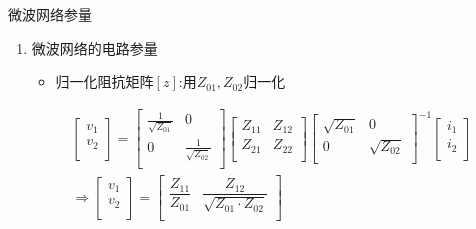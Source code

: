 \begin{frame}{微波网络参量}
    \begin{enumerate}
        \item 微波网络的电路参量
              \begin{itemize}
                  \item 归一化阻抗矩阵$[z]$:用$Z_{01},Z_{02}$归一化
              \end{itemize}
              \begin{gather}
                  \begin{bmatrix*}
                      v_1 \\
                      v_2 \\
                  \end{bmatrix*}
                  =
                  \begin{bmatrix*}
                      \frac{1}{\sqrt{Z_{01}}} & 0\\
                      0 & \frac{1}{\sqrt{Z_{02}}}\\
                  \end{bmatrix*}
                  \begin{bmatrix*}
                      Z_{11} & Z_{12}\\
                      Z_{21} & Z_{22}\\
                  \end{bmatrix*}
                  \begin{bmatrix*}
                      \sqrt{Z_{01}} & 0\\
                      0 & \sqrt{Z_{02}}\\
                  \end{bmatrix*}^{-1}
                  \begin{bmatrix*}
                      i_1\\
                      i_2\\
                  \end{bmatrix*}\label{eqn5-5}\\
                  \Rightarrow
                  \begin{bmatrix*}
                      v_1 \\
                      v_2 \\
                  \end{bmatrix*}
                  =
                  \begin{bmatrix*}
                      \dfrac{Z_{11}}{Z_{01}} & \dfrac{Z_{12}}{\sqrt{Z_{01}\cdot Z_{02}}}\\

\end{bmatrix*}
\end{gather}
\end{enumerate}
\end{frame}
